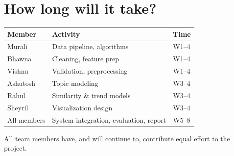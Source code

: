 \documentclass[sigconf,11pt]{acmart}
\begin{document}


\section{How long will it take?} 
\begin{table}[h]
\centering
\small
\setlength{\tabcolsep}{4pt}
\begin{tabular}{l l l}
\hline
Member & Activity & Time \\
\hline
Murali & Data pipeline, algorithms & W1--4 \\
Bhawna & Cleaning, feature prep & W1--4 \\
Vishnu & Validation, preprocessing & W1--4 \\
Ashutosh & Topic modeling & W3--4 \\
Rahul & Similarity \& trend models & W3--4 \\
Sheyril & Visualization design & W3--4 \\
All members & System integration, evaluation, report & W5--8 \\
\hline
\end{tabular}
\end{table}
All team members have, and will continue to, contribute equal effort to the project.
\end{document}
